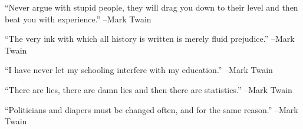\documentclass{article}%
\begin{document}
\linebreak%
\vspace{1mm}%
\begin{minipage}{\textwidth}%
\flushleft%
“Never argue with stupid people, they will drag you down to their level and then beat you with experience.”%
\linebreak%
\vspace{1mm}%
–Mark Twain%
\linebreak%
\vspace{1mm}%
\end{minipage}%
\linebreak%
\vspace{1mm}%
\begin{minipage}{\textwidth}%
\flushleft%
“The very ink with which all history is written is merely fluid prejudice.”%
\linebreak%
\vspace{1mm}%
–Mark Twain%
\linebreak%
\vspace{1mm}%
\end{minipage}%
\linebreak%
\vspace{1mm}%
\begin{minipage}{\textwidth}%
\flushleft%
“I have never let my schooling interfere with my education.”%
\linebreak%
\vspace{1mm}%
–Mark Twain%
\linebreak%
\vspace{1mm}%
\end{minipage}%
\linebreak%
\vspace{1mm}%
\begin{minipage}{\textwidth}%
\flushleft%
“There are lies, there are damn lies and then there are statistics.”%
\linebreak%
\vspace{1mm}%
–Mark Twain%
\linebreak%
\vspace{1mm}%
\end{minipage}%
\linebreak%
\vspace{1mm}%
\begin{minipage}{\textwidth}%
\flushleft%
“Politicians and diapers must be changed often, and for the same reason.”%
\linebreak%
\vspace{1mm}%
–Mark Twain%
\linebreak%
\vspace{1mm}%
\end{minipage}%
\end{document}

